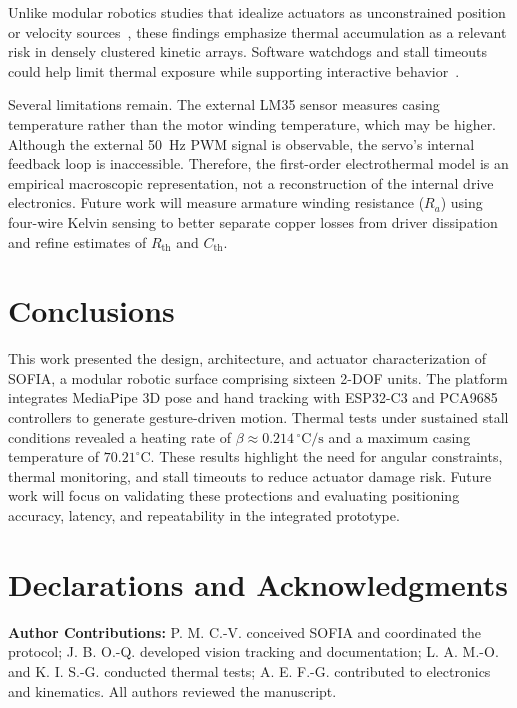 \documentclass[lettersize,journal]{IEEEtran}
\begin{document}
	Unlike modular robotics studies that idealize actuators as
	unconstrained position or velocity sources~\cite{seo2019modular},
	these findings emphasize thermal accumulation as a relevant risk
	in densely clustered kinetic arrays. 	Software watchdogs and stall
	timeouts could help limit thermal exposure while supporting
	interactive behavior~\cite{fong2003social}.
	
	Several limitations remain. The external LM35
	sensor measures casing temperature rather than the motor winding
	temperature, which may be higher. Although the external 50~Hz PWM
	signal is observable, the servo's internal feedback loop is
	inaccessible. Therefore, the first-order electrothermal model is
	an empirical macroscopic representation, not a reconstruction of
	the internal drive electronics. Future work will measure armature
	winding resistance ($R_a$) using four-wire Kelvin sensing to better
	separate copper losses from driver dissipation and refine estimates
	of $R_{\text{th}}$ and $C_{\text{th}}$.
	
	\section{Conclusions}
	\label{sec:conclusions}
	
	This work presented the design, architecture,
	and actuator characterization of SOFIA, a modular robotic surface
	comprising sixteen 2-DOF units. The platform integrates MediaPipe
	3D pose and hand tracking with ESP32-C3 and PCA9685 controllers
	to generate gesture-driven motion. Thermal tests under sustained
	stall conditions revealed a heating rate of
	$\beta \approx 0.214\,^\circ\text{C/s}$ and a maximum casing
	temperature of $70.21^\circ\text{C}$. These results highlight
	the need for angular constraints, thermal monitoring, and
	stall timeouts to reduce actuator damage risk. Future work will
	focus on validating these protections and evaluating positioning
	accuracy, latency, and repeatability in the integrated prototype.
	
	\section*{Declarations and Acknowledgments}
	\footnotesize
	
	\noindent\textbf{Author Contributions:}
	P. M. C.-V. conceived SOFIA and coordinated the protocol;
	J. B. O.-Q. developed vision tracking and documentation;
	L. A. M.-O. and K. I. S.-G. conducted thermal tests;
	A. E. F.-G. contributed to electronics and kinematics.
	All authors reviewed the manuscript.
	
\end{document}
